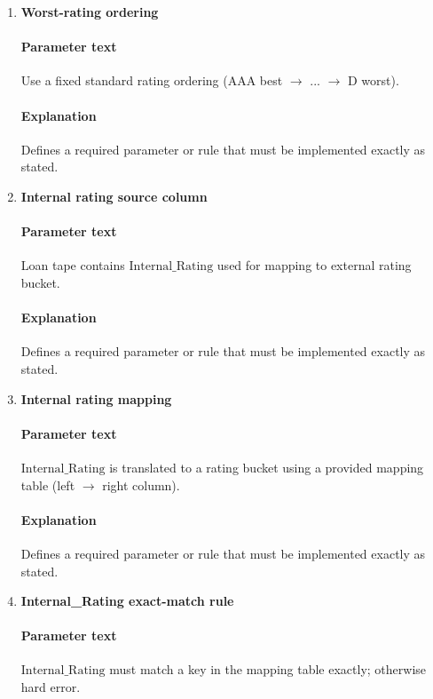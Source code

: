 \documentclass[11pt]{article}
\begin{document}
\begin{enumerate}[label=\arabic*),leftmargin=*,align=left]
\paragraph{Explanation} Defines a required parameter or rule that must be implemented exactly as stated.

\item \textbf{Worst-rating ordering}
\paragraph{Parameter text} Use a fixed standard rating ordering (AAA best $\rightarrow$ ... $\rightarrow$ D worst).
\paragraph{Explanation} Defines a required parameter or rule that must be implemented exactly as stated.

\item \textbf{Internal rating source column}
\paragraph{Parameter text} Loan tape contains $\text{Internal\_Rating}$ used for mapping to external rating bucket.
\paragraph{Explanation} Defines a required parameter or rule that must be implemented exactly as stated.

\item \textbf{Internal rating mapping}
\paragraph{Parameter text} $\text{Internal\_Rating}$ is translated to a rating bucket using a provided mapping table (left $\rightarrow$ right column).
\paragraph{Explanation} Defines a required parameter or rule that must be implemented exactly as stated.

\item \textbf{Internal\_Rating exact-match rule}
\paragraph{Parameter text} $\text{Internal\_Rating}$ must match a key in the mapping table exactly; otherwise hard error.

\end{enumerate}
\end{document}
